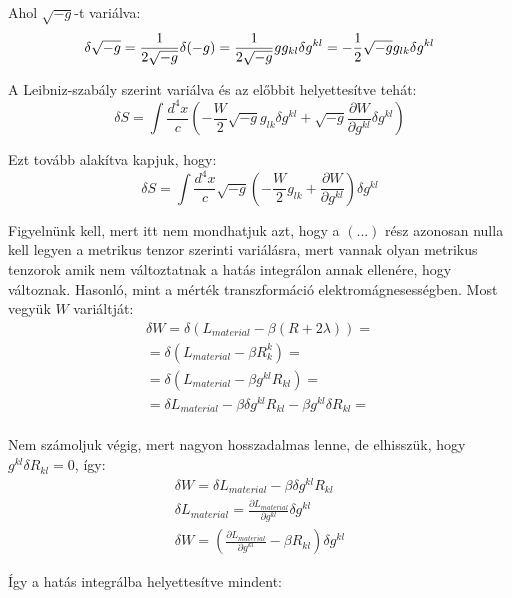 \documentclass[a4paper,12pt]{article}
\begin{document}
\par Ahol $\sqrt{-g}$-t variálva:
\begin{equation*}
    \delta\sqrt{-g} = \frac{1}{2\sqrt{-g}}\delta(-g) = \frac{1}{2\sqrt{-g}}gg_{kl}\delta g^{kl} = -\frac{1}{2}\sqrt{-g}g_{lk}\delta g^{kl} \\
\end{equation*}
\par A Leibniz-szabály szerint variálva és az előbbit helyettesítve tehát:
\begin{equation*}
    \delta S = \int \frac{d^{4}x}{c}(-\frac{W}{2}\sqrt{-g}g_{lk}\delta g^{kl} + \sqrt{-g}\frac{\partial W}{\partial g^{kl}}\delta g^{kl})
\end{equation*}
\par Ezt tovább alakítva kapjuk, hogy:
\begin{equation*}
    \delta S = \int \frac{d^{4}x}{c}\sqrt{-g}(-\frac{W}{2}g_{lk} + \frac{\partial W}{\partial g^{kl}})\delta g^{kl}
\end{equation*}
\par Figyelnünk kell, mert itt nem mondhatjuk azt, hogy a $(...)$ rész azonosan nulla kell legyen a metrikus tenzor szerinti variálásra, mert vannak olyan metrikus tenzorok amik nem változtatnak a hatás integrálon annak ellenére, hogy változnak. Hasonló, mint a mérték transzformáció elektromágnesességben. Most vegyük $W$ variáltját:
\begin{align*}
    \delta W = \delta(L_{material} - \beta(R + 2\lambda)) = \\
    = \delta(L_{material} - \beta R^{k}_{k}) = \\
    = \delta(L_{material} - \beta g^{kl}R_{kl}) = \\
    = \delta L_{material} - \beta \delta g^{kl}R_{kl} - \beta g^{kl}\delta R_{kl} = \\
\end{align*}
\par Nem számoljuk végig, mert nagyon hosszadalmas lenne, de elhisszük, hogy $g^{kl}\delta R_{kl} = 0$, így:
\begin{gather*}
    \delta W = \delta L_{material} - \beta \delta g^{kl} R_{kl} \\
    \delta L_{material} = \frac{\partial L_{material}}{\partial g^{kl}}\delta g^{kl} \\
    \delta W = (\frac{\partial L_{material}}{\partial g^{kl}} - \beta R_{kl})\delta g^{kl}
\end{gather*}
\par Így a hatás integrálba helyettesítve mindent:
\end{document}
